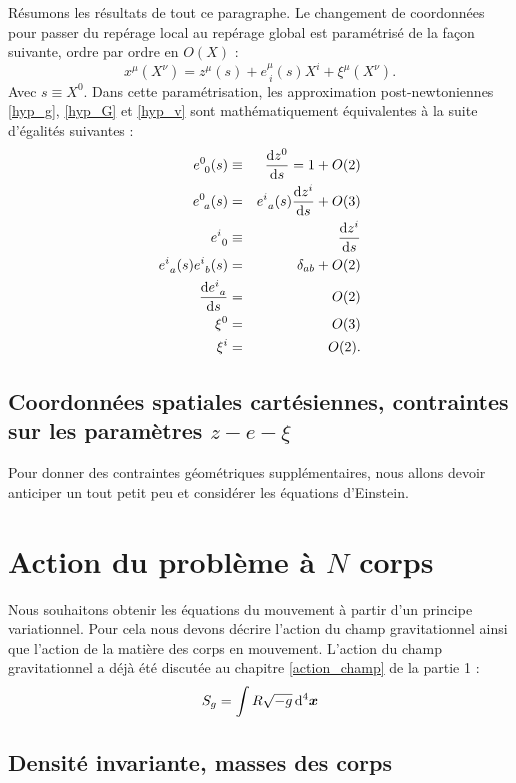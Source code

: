 			Résumons les résultats de tout ce paragraphe. Le changement de coordonnées pour passer du repérage local au repérage global est paramétrisé de la façon suivante, ordre par ordre en $O(X)$ :
			\begin{equation}
				x^\mu(X^\nu)=z^\mu(s)+e^\mu_{\ i}(s)X^i + \xi^\mu(X^\nu).
			\end{equation}
			Avec $s\equiv X^0$.
			Dans cette paramétrisation, les approximation post-newtoniennes \ref{hyp_g}, \ref{hyp_G} et \ref{hyp_v} sont mathématiquement équivalentes à la suite d'égalités suivantes :
			\begin{eqnarray}
				e^0_{\ 0}(s)&\equiv&\frac{\mathrm{d} z^0}{\mathrm{d} s}=1+O(2) \\
				e^0_{\ a}(s)&=&e^i_{\ a}(s)\frac{\mathrm{d} z^i}{\mathrm{d} s}+O(3) \\
				e^i_{\ 0}&\equiv&\frac{\mathrm{d} z^i}{\mathrm{d} s} \\
				e^i_{\ a}(s)e^i_{\ b}(s)&=&\delta_{ab}+O(2) \\
				\frac{\mathrm{d} e^i_{\ a}}{\mathrm{d} s}&=&O(2) \\
				\xi^0&=&O(3) \\
				\xi^i&=&O(2).
			\end{eqnarray}

		\subsection{Coordonnées spatiales cartésiennes, contraintes sur les paramètres $z-e-\xi$}

			Pour donner des contraintes géométriques supplémentaires, nous allons devoir anticiper un tout petit peu et considérer les équations d'Einstein.


	\section{Action du problème à $N$ corps}

		Nous souhaitons obtenir les équations du mouvement à partir d'un principe variationnel. Pour cela nous devons décrire l'action du champ gravitationnel ainsi que l'action de la matière des corps en mouvement. L'action du champ gravitationnel a déjà été discutée au chapitre \ref{action_champ} de la partie 1 :
		\begin{equation}
			S_g = \int R \sqrt{-g} \, \mathrm{d}^4 \bm{x}
		\end{equation}

		\subsection{Densité invariante, masses des corps}

